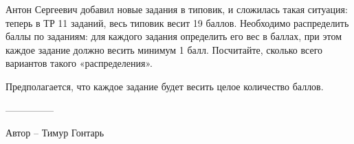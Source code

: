 \question
Антон Сергеевич добавил новые задания в типовик, и сложилась такая ситуация: теперь в ТР 11 заданий, весь типовик весит 19 баллов. Необходимо распределить баллы по заданиям: для каждого задания определить его вес в баллах, при этом каждое задание должно весить минимум 1 балл. Посчитайте, сколько всего вариантов такого «распределения».

Предполагается, что каждое задание будет весить целое количество баллов.

---------------

Автор -- Тимур Гонтарь

